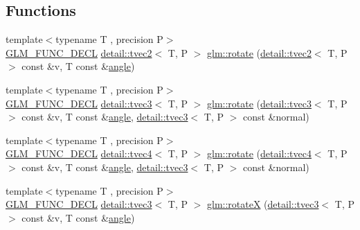 \subsection*{Functions}
\begin{DoxyCompactItemize}
\item 
{\footnotesize template$<$typename T , precision P$>$ }\\\hyperlink{setup_8hpp_ab2d052de21a70539923e9bcbf6e83a51}{G\+L\+M\+\_\+\+F\+U\+N\+C\+\_\+\+D\+E\+CL} \hyperlink{structglm_1_1detail_1_1tvec2}{detail\+::tvec2}$<$ T, P $>$ \hyperlink{group__gtx__rotate__vector_ga5520f6dd671807ec62a8f97c00c1b78b}{glm\+::rotate} (\hyperlink{structglm_1_1detail_1_1tvec2}{detail\+::tvec2}$<$ T, P $>$ const \&v, T const \&\hyperlink{group__gtc__quaternion_ga23a3fc7ada5bbb665ff84c92c6e0542c}{angle})
\item 
{\footnotesize template$<$typename T , precision P$>$ }\\\hyperlink{setup_8hpp_ab2d052de21a70539923e9bcbf6e83a51}{G\+L\+M\+\_\+\+F\+U\+N\+C\+\_\+\+D\+E\+CL} \hyperlink{structglm_1_1detail_1_1tvec3}{detail\+::tvec3}$<$ T, P $>$ \hyperlink{group__gtx__rotate__vector_ga4eccdf3769ce3b5d1e4018394290f88c}{glm\+::rotate} (\hyperlink{structglm_1_1detail_1_1tvec3}{detail\+::tvec3}$<$ T, P $>$ const \&v, T const \&\hyperlink{group__gtc__quaternion_ga23a3fc7ada5bbb665ff84c92c6e0542c}{angle}, \hyperlink{structglm_1_1detail_1_1tvec3}{detail\+::tvec3}$<$ T, P $>$ const \&normal)
\item 
{\footnotesize template$<$typename T , precision P$>$ }\\\hyperlink{setup_8hpp_ab2d052de21a70539923e9bcbf6e83a51}{G\+L\+M\+\_\+\+F\+U\+N\+C\+\_\+\+D\+E\+CL} \hyperlink{structglm_1_1detail_1_1tvec4}{detail\+::tvec4}$<$ T, P $>$ \hyperlink{group__gtx__rotate__vector_gac4abb6be47bd14303d6eded41f2f65f1}{glm\+::rotate} (\hyperlink{structglm_1_1detail_1_1tvec4}{detail\+::tvec4}$<$ T, P $>$ const \&v, T const \&\hyperlink{group__gtc__quaternion_ga23a3fc7ada5bbb665ff84c92c6e0542c}{angle}, \hyperlink{structglm_1_1detail_1_1tvec3}{detail\+::tvec3}$<$ T, P $>$ const \&normal)
\item 
{\footnotesize template$<$typename T , precision P$>$ }\\\hyperlink{setup_8hpp_ab2d052de21a70539923e9bcbf6e83a51}{G\+L\+M\+\_\+\+F\+U\+N\+C\+\_\+\+D\+E\+CL} \hyperlink{structglm_1_1detail_1_1tvec3}{detail\+::tvec3}$<$ T, P $>$ \hyperlink{group__gtx__rotate__vector_gadb69cdc8ea08715c9d8a74f587cf0eac}{glm\+::rotateX} (\hyperlink{structglm_1_1detail_1_1tvec3}{detail\+::tvec3}$<$ T, P $>$ const \&v, T const \&\hyperlink{group__gtc__quaternion_ga23a3fc7ada5bbb665ff84c92c6e0542c}{angle})

\end{DoxyCompactItemize}
